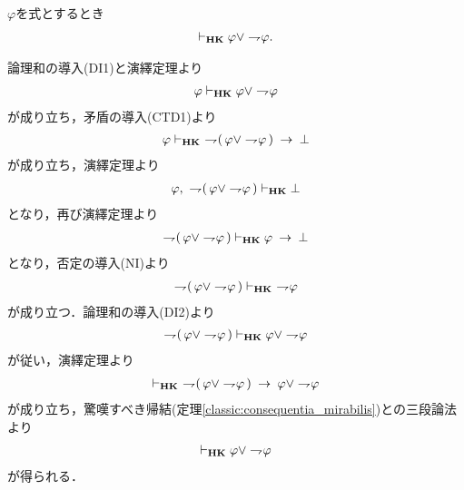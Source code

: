 	\begin{screen}
		\begin{thm}[排中律]\label{classic:law_of_excluded_middle}
			$\varphi$を式とするとき
			\begin{align}
				\vdash_{{\scriptsize \mbox{{\bf HK}}}} \varphi \vee \rightharpoondown\hspace{-0.25em} \varphi.
			\end{align}
		\end{thm}
	\end{screen}
	
	\begin{sketch}
		論理和の導入(DI1)と演繹定理より
		\begin{align}
			\varphi \vdash_{{\scriptsize \mbox{{\bf HK}}}} \varphi \vee \rightharpoondown\hspace{-0.25em} \varphi
		\end{align}
		が成り立ち，矛盾の導入(CTD1)より
		\begin{align}
			\varphi \provable{\mbox{{\bf HK}}}\ 
			\negation (\, \varphi \vee \negation \varphi\, ) \rarrow \bot
		\end{align}
		が成り立ち，演繹定理より
		\begin{align}
			\varphi,\ \rightharpoondown\hspace{-0.25em} (\, \varphi \vee \rightharpoondown\hspace{-0.25em} \varphi\, )
			\vdash_{{\scriptsize \mbox{{\bf HK}}}} \bot
		\end{align}
		となり，再び演繹定理より
		\begin{align}
			\rightharpoondown\hspace{-0.25em} (\, \varphi \vee \rightharpoondown\hspace{-0.25em} \varphi\, )
			\vdash_{{\scriptsize \mbox{{\bf HK}}}} \varphi \hspace{0.25em}\rightarrow\hspace{0.25em} \bot
		\end{align}
		となり，否定の導入(NI)より
		\begin{align}
			\rightharpoondown\hspace{-0.25em} (\, \varphi \vee \rightharpoondown\hspace{-0.25em} \varphi\, )
			\vdash_{{\scriptsize \mbox{{\bf HK}}}}\ \rightharpoondown\hspace{-0.25em} \varphi
		\end{align}
		が成り立つ．論理和の導入(DI2)より
		\begin{align}
			\rightharpoondown\hspace{-0.25em} (\, \varphi \vee \rightharpoondown\hspace{-0.25em} \varphi\, )
			\vdash_{{\scriptsize \mbox{{\bf HK}}}} \varphi \vee \rightharpoondown\hspace{-0.25em} \varphi
		\end{align}
		が従い，演繹定理より
		\begin{align}
			\provable{\mbox{{\bf HK}}}\ 
			\negation (\, \varphi \vee \negation \varphi\, )
			\rarrow \varphi \vee \negation \varphi
		\end{align}
		が成り立ち，驚嘆すべき帰結(定理\ref{classic:consequentia_mirabilis})との三段論法より
		\begin{align}
			\vdash_{{\scriptsize \mbox{{\bf HK}}}} \varphi \vee \rightharpoondown\hspace{-0.25em} \varphi
		\end{align}
		が得られる．
		\QED
	\end{sketch}
	
